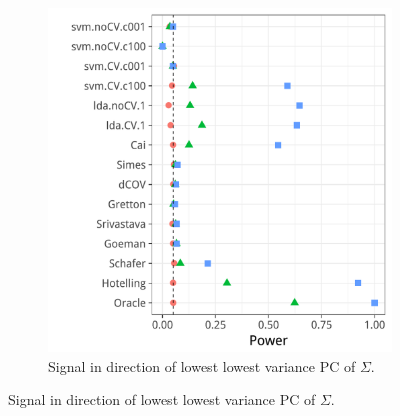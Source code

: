 \documentclass[journal]{IEEEtran}
\begin{document}
\begin{figure}[h]
\begin{subfigure}[t]{.45\columnwidth}
		\includegraphics[width=1\columnwidth]{"art/file23"}
		\caption{Signal in direction of lowest lowest variance PC of $\Sigma$.} 
		\label{fig:dependence_22}
	\end{subfigure}
\end{figure}
\end{document}
